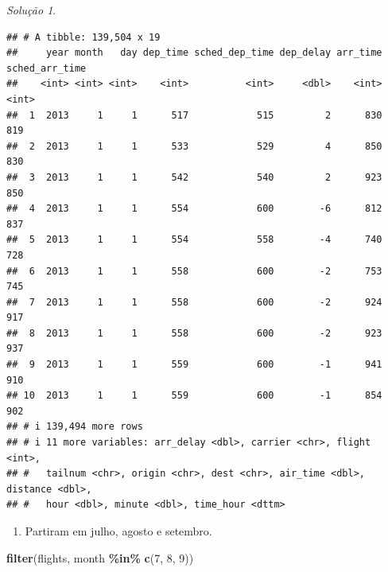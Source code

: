 \documentclass[
]{latex/krantz}
\newenvironment{Shaded}{\begin{snugshade}}{\end{snugshade}}
\newcommand{\DecValTok}[1]{\textcolor[rgb]{0.00,0.00,0.81}{#1}}
\newcommand{\FunctionTok}[1]{\textcolor[rgb]{0.13,0.29,0.53}{\textbf{#1}}}
\newcommand{\NormalTok}[1]{#1}
\newcommand{\SpecialCharTok}[1]{\textcolor[rgb]{0.81,0.36,0.00}{\textbf{#1}}}
\providecommand{\tightlist}{%
  \setlength{\itemsep}{0pt}\setlength{\parskip}{0pt}}
\theoremstyle{definition}
\theoremstyle{definition}
\theoremstyle{definition}
\theoremstyle{definition}
\theoremstyle{remark}
\newtheorem*{solution}{Solução}
\begin{document}
\begin{solution}
\begin{verbatim}
## # A tibble: 139,504 x 19
##     year month   day dep_time sched_dep_time dep_delay arr_time sched_arr_time
##    <int> <int> <int>    <int>          <int>     <dbl>    <int>          <int>
##  1  2013     1     1      517            515         2      830            819
##  2  2013     1     1      533            529         4      850            830
##  3  2013     1     1      542            540         2      923            850
##  4  2013     1     1      554            600        -6      812            837
##  5  2013     1     1      554            558        -4      740            728
##  6  2013     1     1      558            600        -2      753            745
##  7  2013     1     1      558            600        -2      924            917
##  8  2013     1     1      558            600        -2      923            937
##  9  2013     1     1      559            600        -1      941            910
## 10  2013     1     1      559            600        -1      854            902
## # i 139,494 more rows
## # i 11 more variables: arr_delay <dbl>, carrier <chr>, flight <int>,
## #   tailnum <chr>, origin <chr>, dest <chr>, air_time <dbl>, distance <dbl>,
## #   hour <dbl>, minute <dbl>, time_hour <dttm>
\end{verbatim}

\begin{enumerate}
\def\labelenumi{\alph{enumi}.}
\setcounter{enumi}{3}
\tightlist
\item
  Partiram em julho, agosto e setembro.
\end{enumerate}

\begin{Shaded}
\begin{Highlighting}[]
\FunctionTok{filter}\NormalTok{(flights, month }\SpecialCharTok{\%in\%} \FunctionTok{c}\NormalTok{(}\DecValTok{7}\NormalTok{, }\DecValTok{8}\NormalTok{, }\DecValTok{9}\NormalTok{))}
\end{Highlighting}
\end{Shaded}


\end{solution}
\end{document}
